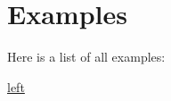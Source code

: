 \section{Examples}
Here is a list of all examples\+:\begin{DoxyCompactItemize}
\item 
\hyperlink{left-example}{left}
\end{DoxyCompactItemize}
